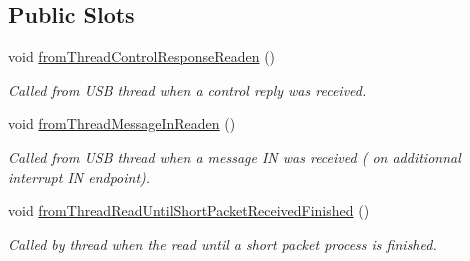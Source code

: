 \subsection*{Public Slots}
\begin{DoxyCompactItemize}
\item 
void \hyperlink{classmdt_usb_port_manager_af043c75c74665b23d13f3cb73150935c}{from\-Thread\-Control\-Response\-Readen} ()
\begin{DoxyCompactList}\small\item\em Called from U\-S\-B thread when a control reply was received. \end{DoxyCompactList}\item 
void \hyperlink{classmdt_usb_port_manager_a9b7154590a4eb267aff4e11ba53dd7aa}{from\-Thread\-Message\-In\-Readen} ()
\begin{DoxyCompactList}\small\item\em Called from U\-S\-B thread when a message I\-N was received ( on additionnal interrupt I\-N endpoint). \end{DoxyCompactList}\item 
void \hyperlink{classmdt_usb_port_manager_a8f53dc5445b7f8f4a077f3cc25880b5d}{from\-Thread\-Read\-Until\-Short\-Packet\-Received\-Finished} ()
\begin{DoxyCompactList}\small\item\em Called by thread when the read until a short packet process is finished. \end{DoxyCompactList}\end{DoxyCompactItemize}
